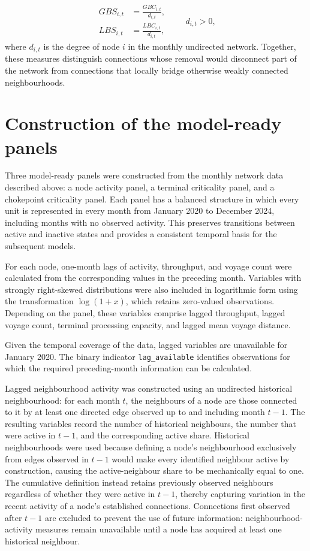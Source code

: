 \documentclass[pdftex,12pt,openright,a4paper,oneside]{book}
\begin{document}
\begin{equation}
\begin{aligned}
GBS_{i,t}
&=
\frac{GBC_{i,t}}{d_{i,t}}, \\
LBS_{i,t}
&=
\frac{LBC_{i,t}}{d_{i,t}},
\end{aligned}
\qquad d_{i,t}>0,
\label{eq:bridge_shares}
\end{equation}
where \(d_{i,t}\) is the degree of node \(i\) in the monthly undirected network. 
Together, these measures distinguish connections whose removal would disconnect part of the network from connections that locally bridge otherwise weakly connected neighbourhoods.

\section{Construction of the model-ready panels}
\label{sec:model_ready_panels}
Three model-ready panels were constructed from the monthly network data described above: a node activity panel, a terminal criticality panel, and a chokepoint criticality panel. 
Each panel has a balanced structure in which every unit is represented in every month from January 2020 to December 2024, including months with no observed activity. This preserves transitions between active and inactive states and provides a consistent temporal basis for the subsequent models.

For each node, one-month lags of activity, throughput, and voyage count were calculated from the corresponding values in the preceding month. 
Variables with strongly right-skewed distributions were also included in logarithmic form using the transformation \(\log(1+x)\), which retains zero-valued observations. 
Depending on the panel, these variables comprise lagged throughput, lagged voyage count, terminal processing capacity, and lagged mean voyage distance.

Given the temporal coverage of the data, lagged variables are unavailable for January 2020. The binary indicator \texttt{lag\_available} identifies observations for which the required preceding-month information can be calculated.

Lagged neighbourhood activity was constructed using an undirected historical neighbourhood: for each month \(t\), the neighbours of a node are those connected to it by at least one directed edge observed up to and including month \(t-1\). 
The resulting variables record the number of historical neighbours, the number that were active in \(t-1\), and the corresponding active share.
Historical neighbourhoods were used because defining a node's neighbourhood exclusively from edges observed in \(t-1\) would make every identified neighbour active by construction, causing the active-neighbour share to be mechanically equal to one. 
The cumulative definition instead retains previously observed neighbours regardless of whether they were active in \(t-1\), thereby capturing variation in the recent activity of a node's established connections. 
Connections first observed after \(t-1\) are excluded to prevent the use of future information: neighbourhood-activity measures remain unavailable until a node has acquired at least one historical neighbour.
\end{document}

